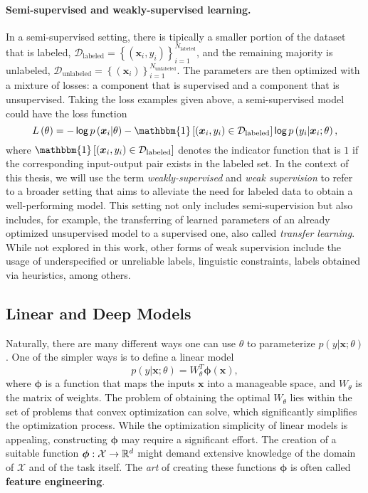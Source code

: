 \paragraph*{Semi-supervised and weakly-supervised learning.} In a
semi-supervised setting, there is tipically a smaller portion of the
dataset that is labeled,
$\mathcal{D}_{\text{labeled}}=\left\{(\bm{x}_i,y_i)\right\}_{i=1}^{N_{\text{labeled}}}$,
and the remaining majority is unlabeled,
$\mathcal{D}_{\text{unlabeled}}=\left\{(\bm{x}_i)\right\}_{i=1}^{N_{\text{unlabeled}}}$.
The parameters are then optimized with a mixture of losses: a
component that is supervised and a component that is unsupervised.
Taking the loss examples given above, a semi-supervised model could
have the loss function
%
\begin{equation}
    L\left(\theta\right)=
    -\log p\left(\bm{x}_i|\theta\right)
    -\mathbbm{1}\left[(\bm{x}_i,y_i)\in\mathcal{D}_{\text{labeled}}\right]
    \log p\left(y_i|\bm{x}_i;\theta\right),
\end{equation}
%
where
$\mathbbm{1}\left[(\bm{x}_i,y_i)\in\mathcal{D}_{\text{labeled}}\right]$
denotes the indicator function that is $1$ if the corresponding
input-output pair exists in the labeled set. In the context of this
thesis, we will use the term \textit{weakly-supervised} and
\textit{weak supervision} to refer to a broader setting that aims to
alleviate the need for labeled data to obtain a well-performing
model. This setting not only includes semi-supervision but also
includes, for example, the transferring of learned parameters of an
already optimized unsupervised model to a supervised one, also called
\textit{transfer learning}. While not explored in this work, other
forms of weak supervision include the usage of underspecified or
unreliable labels, linguistic constraints, labels obtained via
heuristics, among others.

\subsection{Linear and Deep Models}

Naturally, there are many different ways one can use $\theta$ to
parameterize $p\left(y|\bm{x};\theta\right)$. One of the simpler ways
is to define a linear model
%
\begin{equation}
    p\left(y|\bm{x};\theta\right)=W_{\theta}^T\bm{\phi}\left(\bm{x}\right),
    \label{eq:linear}
\end{equation}
%
where $\bm{\phi}$ is a function that maps the inputs $\bm{x}$ into a
manageable space, and $W_{\theta}$ is the matrix of weights. The
problem of obtaining the optimal $W_{\theta}$ lies within the set of
problems that convex optimization can solve, which significantly
simplifies the optimization process. While the optimization
simplicity of linear models is appealing, constructing $\bm{\phi}$
may require a significant effort. The creation of a suitable function
$\bm{\phi}: \mathcal{X} \rightarrow \mathbb{R}^d$ might demand extensive
knowledge of the domain of $\mathcal{X}$ and of the task itself. The
\textit{art} of creating these functions $\bm{\phi}$ is often called
\textbf{feature engineering}.

